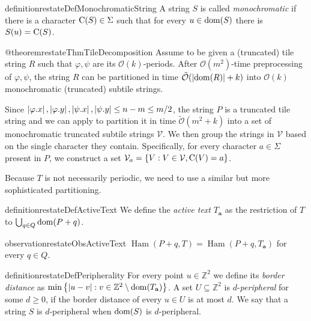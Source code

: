 \documentclass[twoside,leqno]{article}
\newcommand{\Z}{\mathbb{Z}}
\renewcommand{\O}{\mathcal{O}}
\newcommand{\tO}{\tilde{\mathcal{O}}}
\newcommand{\V}{\mathcal{V}}
\renewcommand{\phi}{\varphi}
\newcommand{\set}[1]{\left\lbrace #1 \right\rbrace}
\DeclareMathOperator*{\Ham}{Ham}
\newcommand{\absolute}[1]{\left\lvert#1\right\rvert}
\begin{document}
\begin{restatable*}{definition}{restateDefMonochromaticString}
A string $S$ is called \emph{monochromatic} if there is a character $\operatorname*{C}(S) \in \Sigma$ such that for every $u \in \operatorname*{dom}(S)$ there is $S(u) = \operatorname*{C}(S)$.  
\end{restatable*}

\begin{restatable*}{@theorem}{restateThmTileDecomposition}\label{tile_decomposition}
Assume to be given a (truncated) tile string $R$ such that $\phi, \psi$ are its $\O(k)$-periods. After $\O(m^2)$-time preprocessing of $\phi, \psi$, the string $R$ can be partitioned in time $\tO(\absolute{\d{R}} + k)$ into $\O(k)$ monochromatic (truncated) subtile strings.
\end{restatable*}

Since $\absolute{\x{\phi}}, \absolute{\y{\phi}}, \absolute{\x{\psi}}, \absolute{\y{\psi}} \le n - m \le m / 2$, the string $P$ is a truncated tile string and we can apply  to partition it in time $\tO(m^2 + k)$ into a set of monochromatic truncated subtile strings $\V$. We then group the strings in $\V$ based on the single character they contain. Specifically, for every character $a \in \Sigma$ present in $P$, we construct a set $\V_a = \set{V : V \in \V, \getchar{V} = a}$.

Because $T$ is not necessarily periodic, we need to use a similar but more sophisticated partitioning.

\newcommand{\Ta}{T_\mathbf{a}}
\begin{restatable*}{definition}{restateDefActiveText}
We define the \emph{active text} $\Ta$ as the restriction of $T$ to $\bigcup_{q \in Q} \operatorname*{dom}(P + q)$. 
\end{restatable*}

\begin{restatable*}{observation}{restateObsActiveText}\label{obs:active_text}
$\Ham(P + q, T) = \Ham(P + q, \Ta)$ for every $q \in Q$.
\end{restatable*}

\begin{restatable*}[Peripherality]{definition}{restateDefPeripherality}
For every point $u \in \Z^2$ we define its \emph{border distance} as $\min\set{\absolute{u - v} : v \in \Z^2 \setminus \d{\Ta}}$. A set $U \subseteq \Z^2$ is $d$-\emph{peripheral} for some $d \ge 0$, if the border distance of every $u \in U$ is at most $d$. We say that a string $S$ is $d$-peripheral when $\operatorname*{dom}(S)$ is $d$-peripheral.
\end{restatable*}
\end{document}
